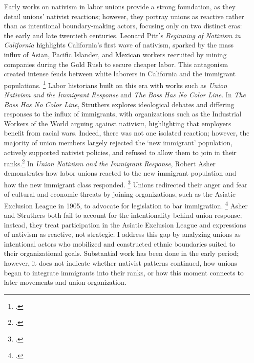 \documentclass[12pt,a4paper]{article}
\begin{document}
Early works on nativism in labor unions provide a strong foundation, as they detail unions’ nativist reactions; however, they portray unions as reactive rather than as intentional boundary-making actors, focusing only on two distinct eras: the early and late twentieth centuries. Leonard Pitt's \textit{Beginning of Nativism in California} highlights California's first wave of nativism, sparked by the mass influx of Asian, Pacific Islander, and Mexican workers recruited by mining companies during the Gold Rush to secure cheaper labor. This antagonism created intense feuds between white laborers in California and the immigrant populations. \footcite{pitt_beginnings_nodate} Labor historians built on this era with works such as \textit{Union Nativism and the Immigrant Response} and \textit{The Boss Has No Color Line}. In \textit{The Boss Has No Color Line}, Struthers explores ideological debates and differing responses to the influx of immigrants, with organizations such as the Industrial Workers of the World arguing against nativism, highlighting that employers benefit from racial wars. Indeed, there was not one isolated reaction; however, the majority of union members largely rejected the `new immigrant' population, actively supported nativist policies, and refused to allow them to join in their ranks.\footcite{struthers_boss_2013} In \textit{Union Nativism and the Immigrant Response}, Robert Asher demonstrates how labor unions reacted to the new immigrant population and how the new immigrant class responded. \footcite{asher_union_2008} Unions redirected their anger and fear of cultural and economic threats by joining organizations, such as the Asiatic Exclusion League in 1905, to advocate for legislation to bar immigration. \footcites{chand_life_2025}{hinnershitz_demanding_2015} Asher and Struthers both fail to account for the intentionality behind union response; instead, they treat participation in the Asiatic Exclusion League and expressions of nativism as reactive, not strategic. I address this gap by analyzing unions as intentional actors who mobilized and constructed ethnic boundaries suited to their organizational goals. Substantial work has been done in the early period; however, it does not indicate whether nativist patterns continued, how unions began to integrate immigrants into their ranks, or how this moment connects to later movements and union organization.
\end{document}
